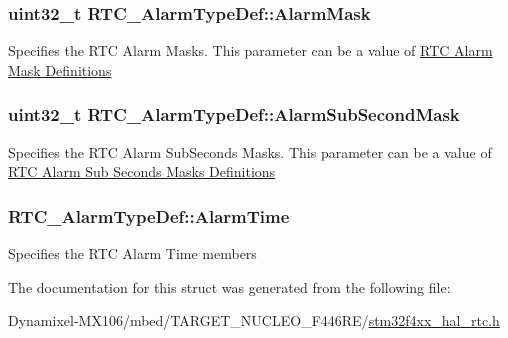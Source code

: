 \subsubsection[{\texorpdfstring{Alarm\+Mask}{AlarmMask}}]{\setlength{\rightskip}{0pt plus 5cm}uint32\+\_\+t R\+T\+C\+\_\+\+Alarm\+Type\+Def\+::\+Alarm\+Mask}\hypertarget{struct_r_t_c___alarm_type_def_a6d5665858df4c99e589beebe7f2d120b}{}\label{struct_r_t_c___alarm_type_def_a6d5665858df4c99e589beebe7f2d120b}
Specifies the R\+TC Alarm Masks. This parameter can be a value of \hyperlink{group___r_t_c___alarm_mask___definitions}{R\+TC Alarm Mask Definitions} 
\subsubsection[{\texorpdfstring{Alarm\+Sub\+Second\+Mask}{AlarmSubSecondMask}}]{\setlength{\rightskip}{0pt plus 5cm}uint32\+\_\+t R\+T\+C\+\_\+\+Alarm\+Type\+Def\+::\+Alarm\+Sub\+Second\+Mask}\hypertarget{struct_r_t_c___alarm_type_def_aa7f311cd270c215530acf93b454db223}{}\label{struct_r_t_c___alarm_type_def_aa7f311cd270c215530acf93b454db223}
Specifies the R\+TC Alarm Sub\+Seconds Masks. This parameter can be a value of \hyperlink{group___r_t_c___alarm___sub___seconds___masks___definitions}{R\+TC Alarm Sub Seconds Masks Definitions} 
\subsubsection[{\texorpdfstring{Alarm\+Time}{AlarmTime}}]{ R\+T\+C\+\_\+\+Alarm\+Type\+Def\+::\+Alarm\+Time}\hypertarget{struct_r_t_c___alarm_type_def_a1e50b47e1b3cb1cf09dee1b9e61028c6}{}\label{struct_r_t_c___alarm_type_def_a1e50b47e1b3cb1cf09dee1b9e61028c6}
Specifies the R\+TC Alarm Time members 

The documentation for this struct was generated from the following file\+:\begin{DoxyCompactItemize}
\item 
Dynamixel-\/\+M\+X106/mbed/\+T\+A\+R\+G\+E\+T\+\_\+\+N\+U\+C\+L\+E\+O\+\_\+\+F446\+R\+E/\hyperlink{stm32f4xx__hal__rtc_8h}{stm32f4xx\+\_\+hal\+\_\+rtc.\+h}\end{DoxyCompactItemize}
